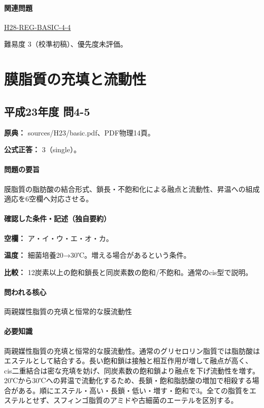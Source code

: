 \paragraph{関連問題} \hyperref[q:h28-reg-basic-4-4]{H28-REG-BASIC-4-4}

\par 難易度 3（校準初稿）、優先度未評価。

\section{膜脂質の充填と流動性}

\subsection{平成23年度 問4-5}
\label{q:h23-reg-basic-4-5}

\noindent\textbf{原典：} sources/H23/basic.pdf、PDF物理14頁。

\textbf{公式正答：} 3（single）。

\paragraph{問題の要旨} 膜脂質の脂肪酸の結合形式、鎖長・不飽和化による融点と流動性、昇温への組成適応を6空欄へ対応させる。

\paragraph{確認した条件・記述（独自要約）}\mbox{}\par

\noindent\textbf{空欄：} ア・イ・ウ・エ・オ・カ。\par

\noindent\textbf{温度：} 細菌培養20→30℃。増える場合があるという条件。\par

\noindent\textbf{比較：} 12炭素以上の飽和鎖長と同炭素数の飽和/不飽和。通常のcis型で説明。\par

\paragraph{問われる核心} 両親媒性脂質の充填と恒常的な膜流動性

\paragraph{必要知識} 両親媒性脂質の充填と恒常的な膜流動性。通常のグリセロリン脂質では脂肪酸はエステルとして結合する。長い飽和鎖は接触と相互作用が増して融点が高く、cis二重結合は密な充填を妨げ、同炭素数の飽和鎖より融点を下げ流動性を増す。20℃から30℃への昇温で流動化するため、長鎖・飽和脂肪酸の増加で相殺する場合がある。順にエステル・高い・長鎖・低い・増す・飽和で3。全ての脂質をエステルとせず、スフィンゴ脂質のアミドや古細菌のエーテルを区別する。

